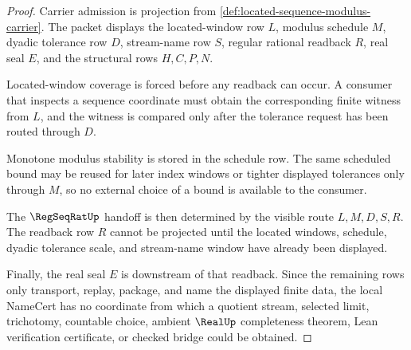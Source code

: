 \begin{proof}
Carrier admission is projection from \autoref{def:located-sequence-modulus-carrier}. The packet displays the located-window row $L$, modulus schedule $M$, dyadic tolerance row $D$, stream-name row $S$, regular rational readback $R$, real seal $E$, and the structural rows $H,C,P,N$.

Located-window coverage is forced before any readback can occur. A consumer that inspects a sequence coordinate must obtain the corresponding finite witness from $L$, and the witness is compared only after the tolerance request has been routed through $D$.

Monotone modulus stability is stored in the schedule row. The same scheduled bound may be reused for later index windows or tighter displayed tolerances only through $M$, so no external choice of a bound is available to the consumer.

The $\RegSeqRatUp$ handoff is then determined by the visible route $L,M,D,S,R$. The readback row $R$ cannot be projected until the located windows, schedule, dyadic tolerance scale, and stream-name window have already been displayed.

Finally, the real seal $E$ is downstream of that readback. Since the remaining rows only transport, replay, package, and name the displayed finite data, the local NameCert has no coordinate from which a quotient stream, selected limit, trichotomy, countable choice, ambient $\RealUp$ completeness theorem, Lean verification certificate, or checked bridge could be obtained.
\end{proof}

